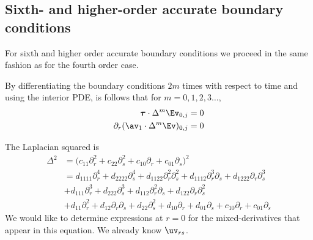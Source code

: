 % 
% 
% 



\subsection{Sixth- and higher-order accurate boundary conditions}

For sixth and higher order accurate boundary conditions we proceed in the same fashion
as for the fourth order case. 

By differentiating the boundary conditions $2m$ times with respect to time and using the 
interior PDE, 
is follows that for $m=0,1,2,3\ldots$,
\begin{align*}
  \tauv\cdot\Delta^m \Ev_{0,j}  &=0  \\
  \partial_r(\av_1\cdot \Delta^m\Ev )_{0,j} &= 0
\end{align*}


The Laplacian squared is
\begin{align*}
   \Delta^2  &= \Big(c_{11} \partial_r^2 + c_{22}\partial_s^2  + c_{10} \partial_r + c_{01} \partial_s \Big)^2 \\
          &= d_{1111}\partial_r^4 + d_{2222}\partial_s^4
             + d_{1122} \partial_r^2\partial_s^2
             + d_{1112} \partial_r^3\partial_s + d_{1222} \partial_r\partial_s^3 \\
        &   + d_{111}\partial_r^3 + d_{222}\partial_s^3
             + d_{112} \partial_r^2\partial_s + d_{122} \partial_r\partial_s^2 \\
    &  +d_{11} \partial_r^2 +d_{12} \partial_r\partial_s + d_{22}\partial_s^2  + d_{10} \partial_r + d_{01} \partial_s 
 + c_{10} \partial_r + c_{01} \partial_s 
\end{align*}
We would like to determine expressions at $r=0$ for the mixed-derivatives that appear in this equation.
We already know $\uv_{rs}$.

